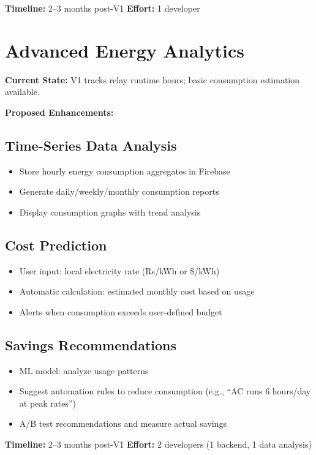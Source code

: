 \textbf{Timeline:} 2–3 months post-V1
\textbf{Effort:} 1 developer

\section{Advanced Energy Analytics}

\textbf{Current State:} V1 tracks relay runtime hours; basic consumption estimation available.

\textbf{Proposed Enhancements:}

\subsection{Time-Series Data Analysis}
\begin{itemize}
    \item Store hourly energy consumption aggregates in Firebase
    \item Generate daily/weekly/monthly consumption reports
    \item Display consumption graphs with trend analysis
\end{itemize}

\subsection{Cost Prediction}
\begin{itemize}
    \item User input: local electricity rate (Rs/kWh or \$/kWh)
    \item Automatic calculation: estimated monthly cost based on usage
    \item Alerts when consumption exceeds user-defined budget
\end{itemize}

\subsection{Savings Recommendations}
\begin{itemize}
    \item ML model: analyze usage patterns
    \item Suggest automation rules to reduce consumption (e.g., ``AC runs 6 hours/day at peak rates'')
    \item A/B test recommendations and measure actual savings
\end{itemize}

\textbf{Timeline:} 2–3 months post-V1
\textbf{Effort:} 2 developers (1 backend, 1 data analysis)

